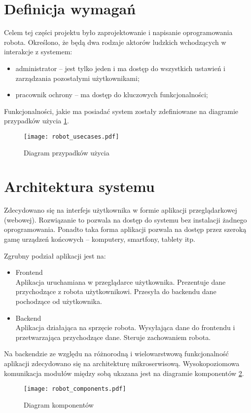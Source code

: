 \section{Definicja wymagań}
Celem tej części projektu było zaprojektowanie i napisanie oprogramowania robota.
Określono, że będą dwa rodzaje aktorów ludzkich wchodzących w interakcje z systemem:
\begin{itemize}
    \item administrator -- jest tylko jeden i ma dostęp do wszystkich ustawień i zarządzania pozostałymi użytkownikami;
    \item pracownik ochrony -- ma dostęp do kluczowych funkcjonalności;
\end{itemize}
Funkcjonalności, jakie ma posiadać system zostały zdefiniowane na diagramie przypadków użycia \ref{rys:usecases}.
\begin{figure}[!hb]
    \centering \texttt{[image: robot\_usecases.pdf]}
    \caption{Diagram przypadków użycia}
    \label{rys:usecases}
\end{figure}

\section{Architektura systemu}
Zdecydowano się na interfejs użytkownika w formie aplikacji przeglądarkowej (webowej).
Rozwiązanie to pozwala na dostęp do systemu bez instalacji żadnego oprogramowania.
Ponadto taka forma aplikacji pozwala na dostęp przez szeroką gamę urządzeń końcowych -- komputery, smartfony, tablety itp.

Zgrubny podział aplikacji jest na:
\begin{itemize}
    \item Frontend \\
    Aplikacja uruchamiana w przeglądarce użytkownika.
    Prezentuje dane przychodzące z robota użytkownikowi.
    Przesyła do backendu dane pochodzące od użytkownika.
    \item Backend \\
    Aplikacja działająca na sprzęcie robota.
    Wysyłająca dane do frontendu i przetwarzająca przychodzące dane.
    Steruje zachowaniem robota.
\end{itemize}

Na backendzie ze względu na różnorodną i wielowarstwową funkcjonalność aplikacji zdecydowano się na architekturę mikroserwisową.
Wysokopoziomowa komunikacja modułów między sobą ukazana jest na diagramie komponentów \ref{rys:components}.
\begin{figure}[!hb]
    \centering \texttt{[image: robot\_components.pdf]}
    \caption{Diagram komponentów}
    \label{rys:components}
\end{figure}

